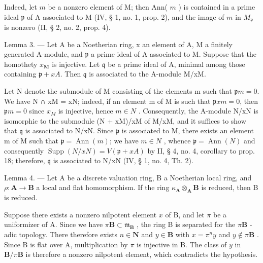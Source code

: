 Indeed, let \(m\) be a nonzero element of M; then Ann( \(m\) ) is contained in a prime ideal \(\mathfrak{p}\) of A associated to M (IV, § 1, no. 1, prop. 2), and the image of \(m\) in \(M_{\mathfrak{p}}\) is nonzero (II, § 2, no. 2, prop. 4).

Lemma 3. — Let A be a Noetherian ring, x an element of A, M a finitely generated A-module, and \(\mathfrak{p}\) a prime ideal of A associated to M. Suppose that the homothety \(x_{\mathbf{M}}\) is injective. Let \(\mathfrak{q}\) be a prime ideal of A, minimal among those containing \(\mathfrak{p} + xA\). Then \(\mathfrak{q}\) is associated to the A-module M/xM.

Let N denote the submodule of M consisting of the elements m such that \(\mathfrak{p}m = 0\). We have N ∩ xM = xN; indeed, if an element m of M is such that \(\mathfrak{p}xm = 0\), then \(\mathfrak{p}m = 0\) since \(x_{M}\) is injective, hence \(m \in N\) . Consequently, the A-module N/xN is isomorphic to the submodule (N + xM)/xM of M/xM, and it suffices to show that \(\mathfrak{q}\) is associated to N/xN. Since \(\mathfrak{p}\) is associated to M, there exists an element m of M such that \(\mathfrak{p} = \operatorname{Ann}(m)\); we have \(m \in N\) , whence \(\mathfrak{p} = \operatorname{Ann}(N)\) and consequently \(\operatorname{Supp}(N/xN) = V(\mathfrak{p} + xA)\) by II, § 4, no. 4, corollary to prop. 18; therefore, \(\mathfrak{q}\) is associated to N/xN (IV, § 1, no. 4, Th. 2).

Lemma 4. — Let A be a discrete valuation ring, B a Noetherian local ring, and \(\rho: \mathbf{A} \to \mathbf{B}\) a local and flat homomorphism. If the ring \(\kappa_{\mathbf{A}} \otimes_{\mathbf{A}} \mathbf{B}\) is reduced, then B is reduced.

Suppose there exists a nonzero nilpotent element \(x\) of B, and let \(\pi\) be a uniformizer of A. Since we have \(\pi \mathbf{B} \subset \mathfrak{m}_{\mathbf{B}}\) , the ring B is separated for the \(\pi \mathbf{B}\) -adic topology. There therefore exists \(n \in \mathbf{N}\) and \(y \in \mathbf{B}\) with \(x = \pi^n y\) and \(y \notin \pi \mathbf{B}\) . Since B is flat over A, multiplication by \(\pi\) is injective in B. The class of \(y\) in \(\mathbf{B}/\pi \mathbf{B}\) is therefore a nonzero nilpotent element, which contradicts the hypothesis.
